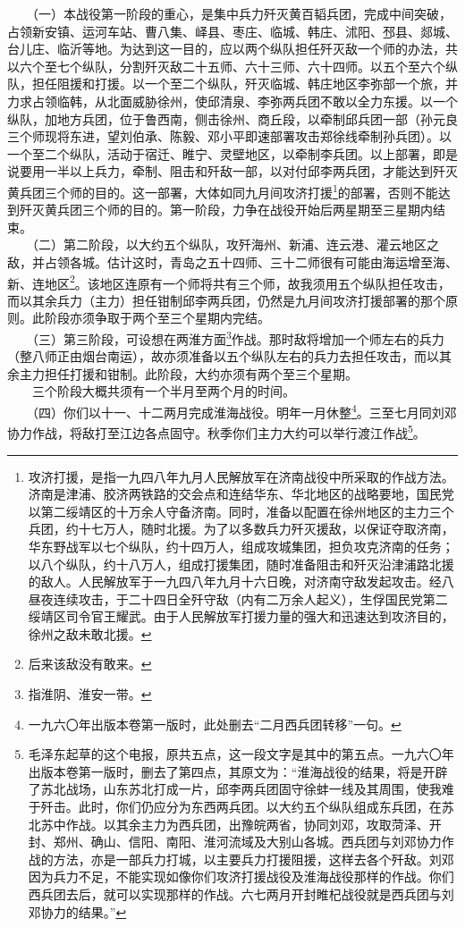 \documentclass[cn,11pt,chinese]{elegantbook}
\begin{document}
　　（一）本战役第一阶段的重心，是集中兵力歼灭黄百韬兵团，完成中间突破，占领新安镇、运河车站、曹八集、峄县、枣庄、临城、韩庄、沭阳、邳县、郯城、台儿庄、临沂等地。为达到这一目的，应以两个纵队担任歼灭敌一个师的办法，共以六个至七个纵队，分割歼灭敌二十五师、六十三师、六十四师。以五个至六个纵队，担任阻援和打援。以一个至二个纵队，歼灭临城、韩庄地区李弥部一个旅，并力求占领临韩，从北面威胁徐州，使邱清泉、李弥两兵团不敢以全力东援。以一个纵队，加地方兵团，位于鲁西南，侧击徐州、商丘段，以牵制邱兵团一部（孙元良三个师现将东进，望刘伯承、陈毅、邓小平即速部署攻击郑徐线牵制孙兵团）。以一个至二个纵队，活动于宿迁、睢宁、灵壁地区，以牵制李兵团。以上部署，即是说要用一半以上兵力，牵制、阻击和歼敌一部，以对付邱李两兵团，才能达到歼灭黄兵团三个师的目的。这一部署，大体如同九月间攻济打援\footnote[2]{ 攻济打援，是指一九四八年九月人民解放军在济南战役中所采取的作战方法。济南是津浦、胶济两铁路的交会点和连结华东、华北地区的战略要地，国民党以第二绥靖区的十万余人守备济南。同时，准备以配置在徐州地区的主力三个兵团，约十七万人，随时北援。为了以多数兵力歼灭援敌，以保证夺取济南，华东野战军以七个纵队，约十四万人，组成攻城集团，担负攻克济南的任务；以八个纵队，约十八万人，组成打援集团，随时准备阻击和歼灭沿津浦路北援的敌人。人民解放军于一九四八年九月十六日晚，对济南守敌发起攻击。经八昼夜连续攻击，于二十四日全歼守敌（内有二万余人起义），生俘国民党第二绥靖区司令官王耀武。由于人民解放军打援力量的强大和迅速达到攻济目的，徐州之敌未敢北援。}的部署，否则不能达到歼灭黄兵团三个师的目的。第一阶段，力争在战役开始后两星期至三星期内结束。\\
　　（二）第二阶段，以大约五个纵队，攻歼海州、新浦、连云港、灌云地区之敌，并占领各城。估计这时，青岛之五十四师、三十二师很有可能由海运增至海、新、连地区\footnote[3]{ 后来该敌没有敢来。}。该地区连原有一个师将共有三个师，故我须用五个纵队担任攻击，而以其余兵力（主力）担任钳制邱李两兵团，仍然是九月间攻济打援部署的那个原则。此阶段亦须争取于两个至三个星期内完结。\\
　　（三）第三阶段，可设想在两淮方面\footnote[4]{ 指淮阴、淮安一带。}作战。那时敌将增加一个师左右的兵力（整八师正由烟台南运），故亦须准备以五个纵队左右的兵力去担任攻击，而以其余主力担任打援和钳制。此阶段，大约亦须有两个至三个星期。\\
　　三个阶段大概共须有一个半月至两个月的时间。\\
　　（四）你们以十一、十二两月完成淮海战役。明年一月休整\footnote[5]{ 一九六〇年出版本卷第一版时，此处删去“二月西兵团转移”一句。}。三至七月同刘邓协力作战，将敌打至江边各点固守。秋季你们主力大约可以举行渡江作战\footnote[6]{ 毛泽东起草的这个电报，原共五点，这一段文字是其中的第五点。一九六〇年出版本卷第一版时，删去了第四点，其原文为：“淮海战役的结果，将是开辟了苏北战场，山东苏北打成一片，邱李两兵团固守徐蚌一线及其周围，使我难于歼击。此时，你们仍应分为东西两兵团。以大约五个纵队组成东兵团，在苏北苏中作战。以其余主力为西兵团，出豫皖两省，协同刘邓，攻取菏泽、开封、郑州、确山、信阳、南阳、淮河流域及大别山各城。西兵团与刘邓协力作战的方法，亦是一部兵力打城，以主要兵力打援阻援，这样去各个歼敌。刘邓因为兵力不足，不能实现如像你们攻济打援战役及淮海战役那样的作战。你们西兵团去后，就可以实现那样的作战。六七两月开封睢杞战役就是西兵团与刘邓协力的结果。”}。\\
\end{document}
